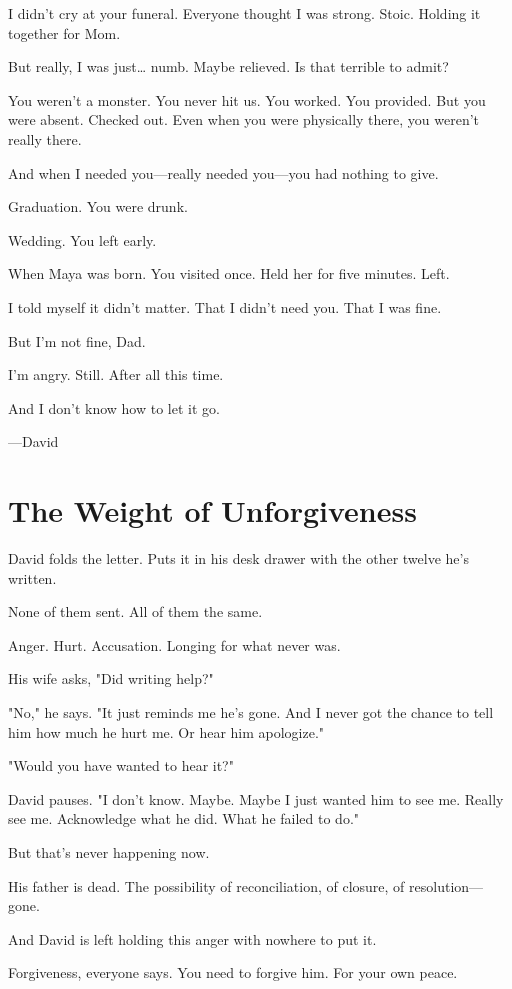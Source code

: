 \documentclass[11pt,twoside]{book}
\begin{document}
I didn't cry at your funeral. Everyone thought I was strong. Stoic. Holding it together for Mom.

But really, I was just\ldots{} numb. Maybe relieved. Is that terrible to admit?

You weren't a monster. You never hit us. You worked. You provided. But you were absent. Checked out. Even when you were physically there, you weren't really there.

And when I needed you—really needed you—you had nothing to give.

Graduation. You were drunk.

Wedding. You left early.

When Maya was born. You visited once. Held her for five minutes. Left.

I told myself it didn't matter. That I didn't need you. That I was fine.

But I'm not fine, Dad.

I'm angry. Still. After all this time.

And I don't know how to let it go.

—David

\section*{The Weight of Unforgiveness}

David folds the letter. Puts it in his desk drawer with the other twelve he's written.

None of them sent. All of them the same.

Anger. Hurt. Accusation. Longing for what never was.

His wife asks, "Did writing help?"

"No," he says. "It just reminds me he's gone. And I never got the chance to tell him how much he hurt me. Or hear him apologize."

"Would you have wanted to hear it?"

David pauses. "I don't know. Maybe. Maybe I just wanted him to see me. Really see me. Acknowledge what he did. What he failed to do."

But that's never happening now.

His father is dead. The possibility of reconciliation, of closure, of resolution—gone.

And David is left holding this anger with nowhere to put it.

Forgiveness, everyone says. You need to forgive him. For your own peace.
\end{document}

